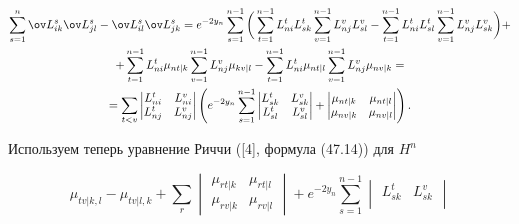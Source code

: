 \begin{pf}
\begin{gather*}
\sum^n_{s=1}\ov L{}^s_{ik}\ov L{}^s_{jl}-\ov L{}^s_{il}\ov L{}^s_{jk}=


e^{-2y_n}\sum_{s=1}^{n-1}\bigg(\sum_{t=1}^{n-1}L^t_{ni}L^t_{sk} 


\sum^{n-1}_{v=1}L^v_{nj}L^v_{sl}-\sum^{n-1}_{t=1}L^t_{ni}L^t_{sl}


\sum^{n-1}_{v=1}L^v_{nj}L^v_{sk} \bigg)+\\


%


+\sum^{n-1}_{t=1}L^t_{ni} \mu_{nt|k} \sum^{n-1}_{v=1}L^v_{nj} \mu_{kv|l}-


\sum^{n-1}_{t=1}L^t_{ni} \mu_{nt|l} \sum^{n-1}_{v=1}L^v_{nj} \mu_{nv|k}=\\


%


=\sum_{t<v}\begin{vmatrix} L^t_{ni} & L^v_{ni} \\ L^t_{nj} & L^v_{nj}


\end{vmatrix}


\left (e^{-2y_n} \sum_{s=1}^{n-1}


\begin{vmatrix} L^t_{sk} & L^v_{sk} \\ L^t_{sl} & L^v_{sl} \end{vmatrix} 


+\begin{vmatrix} \mu_{nt|k} & \mu_{nt|l} \\ \mu_{nv|k} & \mu_{nv|l}


\end{vmatrix}\right).


\end{gather*}





Используем теперь уравнение Риччи ([4], формула (47.14)) для $H^n$


\begin{equation}


\mu_{tv|k,l}-\mu_{tv|l,k}+ \sum_r \begin{vmatrix}


\mu_{rt|k} & \mu_{rt|l} \\ \mu_{rv|k} & \mu_{rv|l} \end{vmatrix}+


e^{-2y_n}\sum_{s=1}^{n-1} \begin{vmatrix} L^t_{sk} & L^v_{sk} \\



\end{vmatrix}
\end{equation}
\end{pf}
